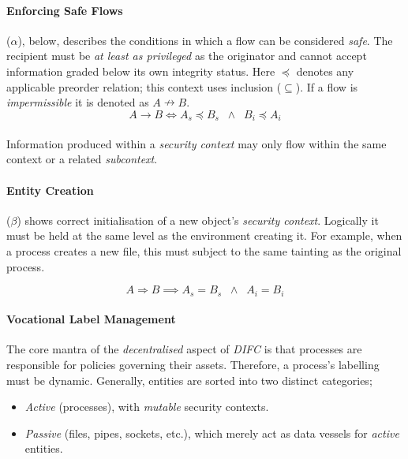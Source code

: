 \paragraph{Enforcing Safe Flows} ($\alpha$), below, describes the conditions in which a flow can be considered \textit{safe}. The recipient must be \textit{at least as privileged} as the originator and cannot accept information graded below its own integrity status. Here $\preceq$ denotes any applicable preorder relation; this context uses inclusion ($\subseteq$). If a flow is \textit{impermissible} it is denoted as $A \nrightarrow B$.
\begin{equation}
    A \rightarrow B \iff A_s \preceq B_s \;\; \land \;\; B_i \preceq A_i \tag{$\alpha$}
\end{equation}
\paragraph{} Information produced within a \textit{security context} may only flow within the same context or a related \textit{subcontext}.

\paragraph{Entity Creation} ($\beta$) shows correct initialisation of a new object's \textit{security context}. Logically it must be held at the same level as the environment creating it. For example, when a process creates a new file, this must subject to the same tainting as the original process.

\begin{equation}
    A \Rightarrow B \implies A_s = B_s \;\; \land \;\; A_i = B_i \tag{$\beta$}
\end{equation}

\paragraph{Vocational Label Management} The core mantra of the \textit{decentralised} aspect of \textit{DIFC} is that processes are responsible for policies governing their assets. Therefore, a process's labelling must be dynamic. Generally, entities are sorted into two distinct categories;

\begin{itemize}
    \item \textit{Active} (processes), with \textit{mutable} security contexts.
    \item \textit{Passive} (files, pipes, sockets, etc.), which merely act as data vessels for \textit{active} entities.
\end{itemize}

